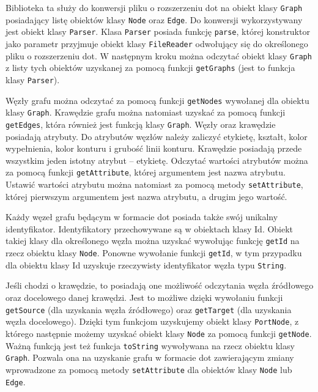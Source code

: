 


Biblioteka\cite{JPGD} ta służy do konwersji pliku o rozszerzeniu dot na obiekt klasy \texttt{Graph} posiadający listę obiektów klasy \texttt{Node} oraz \texttt{Edge}. Do konwersji wykorzystywany jest obiekt klasy \texttt{Parser}. Klasa \texttt{Parser} posiada funkcję \texttt{parse}, której konstruktor jako parametr przyjmuje obiekt klasy \texttt{FileReader} odwołujący się do określonego pliku o rozszerzeniu dot. W następnym kroku można odczytać obiekt klasy \texttt{Graph} z listy tych obiektów uzyskanej za pomocą funkcji \texttt{getGraphs} (jest to funkcja klasy \texttt{Parser}).

Węzły grafu można odczytać za pomocą funkcji \texttt{getNodes} wywołanej dla obiektu klasy \texttt{Graph}. Krawędzie grafu można natomiast uzyskać za pomocą funkcji \texttt{getEdges}, która również jest funkcją klasy \texttt{Graph}. Węzły oraz krawędzie posiadają atrybuty. Do atrybutów węzłów należy zaliczyć etykietę, kształt, kolor wypełnienia, kolor konturu i grubość linii konturu. Krawędzie posiadają przede wszystkim jeden istotny atrybut – etykietę. Odczytać wartości atrybutów można za pomocą funkcji \texttt{getAttribute}, której argumentem jest nazwa atrybutu. Ustawić wartości atrybutu można natomiast za pomocą metody \texttt{setAttribute}, której pierwszym argumentem jest nazwa atrybutu, a drugim jego wartość. 

Każdy węzeł grafu będącym w formacie dot posiada także swój unikalny identyfikator. Identyfikatory przechowywane są w obiektach klasy Id. Obiekt takiej klasy dla określonego węzła można uzyskać wywołując funkcję \texttt{getId} na rzecz obiektu klasy \texttt{Node}. Ponowne wywołanie funkcji \texttt{getId}, w tym przypadku dla obiektu klasy Id uzyskuje rzeczywisty identyfikator węzła typu \texttt{String}. 

Jeśli chodzi o krawędzie, to posiadają one możliwość odczytania węzła źródłowego oraz docelowego danej krawędzi. Jest to możliwe dzięki wywołaniu funkcji \texttt{getSource} (dla uzyskania węzła źródłowego) oraz \texttt{getTarget} (dla uzyskania węzła docelowego). Dzięki tym funkcjom uzyskujemy obiekt klasy \texttt{PortNode}, z którego następnie możemy uzyskać obiekt klasy \texttt{Node} za pomocą funkcji \texttt{getNode}. Ważną funkcją jest też funkcja \texttt{toString} wywoływana na rzecz obiektu klasy \texttt{Graph}. Pozwala ona na uzyskanie grafu w formacie dot zawierającym zmiany wprowadzone za pomocą metody \texttt{setAttribute} dla obiektów klasy \texttt{Node} lub \texttt{Edge}. 

